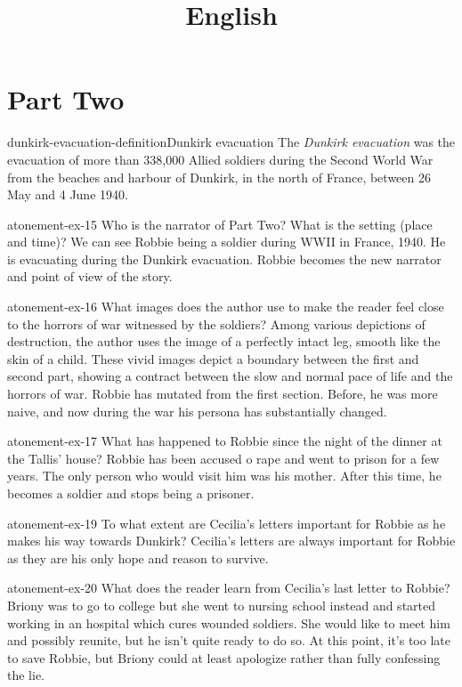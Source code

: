 \documentclass[preview]{standalone}
\begin{document}
\title{English}
\genpage

\section{Part Two}

\begin{snippetdefinition}{dunkirk-evacuation-definition}{Dunkirk evacuation}
    The \textit{Dunkirk evacuation} was the evacuation of more than 338,000
    Allied soldiers during the Second World War from the beaches
    and harbour of Dunkirk, in the north of France, between 26 May and 4 June 1940. 
\end{snippetdefinition}

\begin{snippetexercise}{atonement-ex-15}
    {Who is the narrator of Part Two? What is the setting (place and time)?}
    We can see Robbie being a soldier during WWII in France, 1940.
    He is evacuating during the Dunkirk evacuation.
    Robbie becomes the new narrator and point of view of the story.
\end{snippetexercise}

\begin{snippetexercise}{atonement-ex-16}
    {What images does the author use to make the reader feel close to the horrors of war witnessed
    by the soldiers?}
    Among various depictions of destruction, the author uses the image of a perfectly
    intact leg, smooth like the skin of a child.
    These vivid images depict a boundary between the first and second
    part, showing a contract between the slow and normal pace of life
    and the horrors of war.
    Robbie has mutated from the first section. Before, he was more naive,
    and now during the war his persona has substantially changed.
\end{snippetexercise}

\begin{snippetexercise}{atonement-ex-17}
    {What has happened to Robbie since the night of the dinner at the Tallis' house?}
    Robbie has been accused o rape and went to prison for a few years.
    The only person who would visit him was his mother.
    After this time, he becomes a soldier and stops being a prisoner.
\end{snippetexercise}

\begin{snippetexercise}{atonement-ex-19}
    {To what extent are Cecilia's letters important for Robbie as he makes his way towards Dunkirk?}
    Cecilia's letters are always important for Robbie as they are
    his only hope and reason to survive.
\end{snippetexercise}

\begin{snippetexercise}{atonement-ex-20}
    {What does the reader learn from Cecilia's last letter to Robbie?}
    Briony was to go to college but she went to nursing school instead
    and started working in an hospital which cures wounded soldiers.
    She would like to meet him and possibly reunite,
    but he isn't quite ready to do so.
    At this point, it's too late to save Robbie, but Briony could at least
    apologize rather than fully confessing the lie.
\end{snippetexercise}
\end{document}
